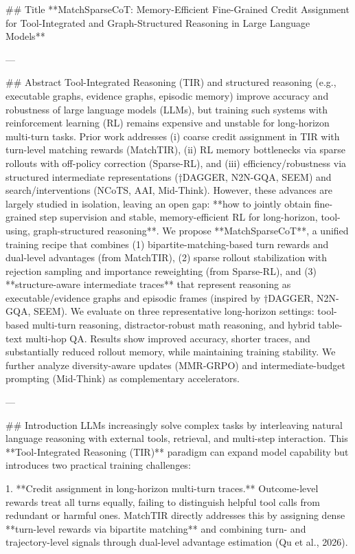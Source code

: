 ## Title
**MatchSparseCoT: Memory-Efficient Fine-Grained Credit Assignment for Tool-Integrated and Graph-Structured Reasoning in Large Language Models**

---

## Abstract
Tool-Integrated Reasoning (TIR) and structured reasoning (e.g., executable graphs, evidence graphs, episodic memory) improve accuracy and robustness of large language models (LLMs), but training such systems with reinforcement learning (RL) remains expensive and unstable for long-horizon multi-turn tasks. Prior work addresses (i) coarse credit assignment in TIR with turn-level matching rewards (MatchTIR), (ii) RL memory bottlenecks via sparse rollouts with off-policy correction (Sparse-RL), and (iii) efficiency/robustness via structured intermediate representations (†DAGGER, N2N-GQA, SEEM) and search/interventions (NCoTS, AAI, Mid-Think). However, these advances are largely studied in isolation, leaving an open gap: **how to jointly obtain fine-grained step supervision and stable, memory-efficient RL for long-horizon, tool-using, graph-structured reasoning**.
We propose **MatchSparseCoT**, a unified training recipe that combines (1) bipartite-matching-based turn rewards and dual-level advantages (from MatchTIR), (2) sparse rollout stabilization with rejection sampling and importance reweighting (from Sparse-RL), and (3) **structure-aware intermediate traces** that represent reasoning as executable/evidence graphs and episodic frames (inspired by †DAGGER, N2N-GQA, SEEM). We evaluate on three representative long-horizon settings: tool-based multi-turn reasoning, distractor-robust math reasoning, and hybrid table-text multi-hop QA. Results show improved accuracy, shorter traces, and substantially reduced rollout memory, while maintaining training stability. We further analyze diversity-aware updates (MMR-GRPO) and intermediate-budget prompting (Mid-Think) as complementary accelerators.

---

## Introduction
LLMs increasingly solve complex tasks by interleaving natural language reasoning with external tools, retrieval, and multi-step interaction. This **Tool-Integrated Reasoning (TIR)** paradigm can expand model capability but introduces two practical training challenges:

1. **Credit assignment in long-horizon multi-turn traces.** Outcome-level rewards treat all turns equally, failing to distinguish helpful tool calls from redundant or harmful ones. MatchTIR directly addresses this by assigning dense **turn-level rewards via bipartite matching** and combining turn- and trajectory-level signals through dual-level advantage estimation (Qu et al., 2026).

